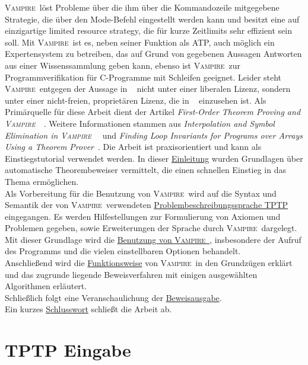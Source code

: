 \documentclass{article}
\newcommand{\vampire}{\textsc{Vampire}~}
\begin{document}
\vampire löst Probleme über die ihm über die Kommandozeile mitgegebene Strategie, die über den Mode-Befehl eingestellt werden kann und besitzt eine auf einzigartige limited resource strategy, die für kurze Zeitlimits sehr effizient sein soll. Mit \vampire ist es, neben seiner Funktion als ATP, auch möglich ein Expertensystem zu betreiben, das auf Grund von gegebenen Aussagen Antworten aus einer Wissenssammlung geben kann, ebenso ist \vampire zur Programmverifikation für C-Programme mit Schleifen geeignet. 
Leider steht \vampire entgegen der Aussage in ~\cite{cav2013} nicht unter einer liberalen Lizenz, sondern unter einer nicht-freien, proprietären Lizenz, die in ~\cite{vampirehp} einzusehen ist.
Als Primärquelle für diese Arbeit dient der Artikel \textit{First-Order Theorem Proving and \vampire}~\cite{cav2013}.
Weitere Informationen stammen aus \textit{Interpolation and Symbol Elimination in \vampire}~\cite{hoder2010} 
und \textit{Finding Loop Invariants for Programs over Arrays Using a Theorem Prover}~\cite{kovacs2009finding}.
Die Arbeit ist praxisorientiert und kann als Einstiegstutorial verwendet werden.
In dieser \hyperref[sec:introduction]{Einleitung} wurden Grundlagen über automatische Theorembeweiser vermittelt, die einen schnellen Einstieg in das Thema ermöglichen.\\
Als Vorbereitung für die Benutzung von \vampire wird auf die Syntax und Semantik der von \vampire verwendeten \hyperref[sec:input]{Problembeschreibungssprache TPTP} eingegangen. Es werden Hilfestellungen zur Formulierung von Axiomen und Problemen gegeben, sowie Erweiterungen der Sprache durch \vampire dargelegt.
Mit dieser Grundlage wird die \hyperref[sec:invocation]{Benutzung von \vampire}, insbesondere der Aufruf des Programms und die vielen einstellbaren Optionen behandelt.\\
Anschließend wird die \hyperref[sec:mechanics]{Funktionsweise} von \vampire in den Grundzügen erklärt und das zugrunde liegende Beweisverfahren mit einigen ausgewählten Algorithmen erläutert.\\
Schließlich folgt eine Veranschaulichung der \hyperref[sec:output]{Beweisausgabe}. \\
Ein kurzes \hyperref[sec:conclusion]{Schlusswort} schließt die Arbeit ab.



\section{TPTP Eingabe}
\label{sec:input}
\end{document}
